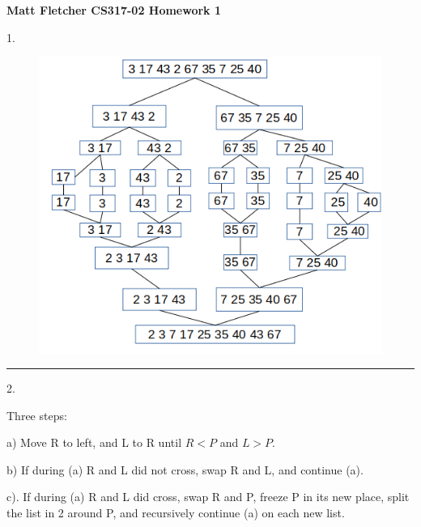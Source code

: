 \documentclass{article}
\begin{document}
	

\thispagestyle{empty}

\let\oldemptyset\emptyset
\let\emptyset\varnothing


\newcommand*{\Perm}[2]{{}^{#1}\!P_{#2}}
\newcommand*{\Comb}[2]{{}_{#1}C_{#2}}


	
\textbf{	Matt Fletcher CS317-02 Homework 1}
\smallskip


1.  


\begin{figure}[H]
\includegraphics[scale=0.5]{./P1/sorted}
\centering
\end{figure}


\noindent\rule{8cm}{0.4pt}



2. 

Three steps:

a) Move R to left, and L to R until $R<P$ and $L>P$. 

b) If during (a) R and L did not cross, swap R and L, and continue (a). 

c). If during (a) R and L did cross, swap R and P, freeze P in its new place, split the list in 2 around P, and recursively continue (a) on each new list. 
\end{document}
